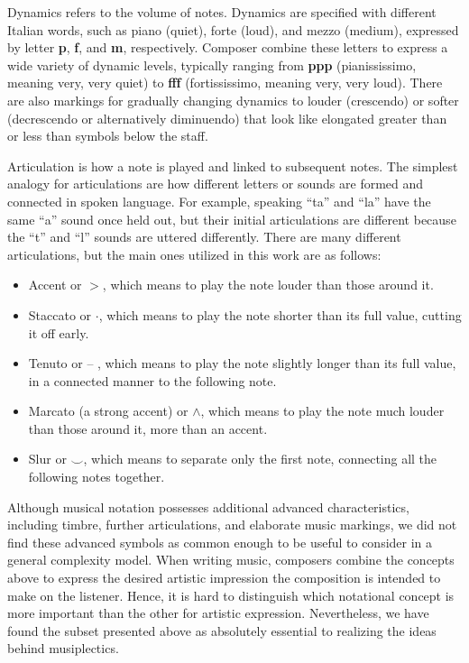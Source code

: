 \documentclass[10pt,preprint]{sigplanconf}
\begin{document}
Dynamics refers to the volume of notes. Dynamics are specified with different Italian words, such as piano (quiet), forte (loud), and mezzo (medium), expressed by letter \textbf{p}, \textbf{f}, and \textbf{m}, respectively. Composer combine these letters to express a wide variety of dynamic levels, typically ranging from \textbf{ppp} (pianississimo, meaning very, very quiet) to \textbf{fff} (fortississimo, meaning very, very loud). There are also markings for gradually changing dynamics to louder (crescendo) or softer (decrescendo or alternatively diminuendo) that look like elongated greater than or less than symbols below the staff.

Articulation is how a note is played and linked to subsequent notes. The simplest analogy for articulations are how different letters or sounds are formed and connected in spoken language. For example, speaking ``ta'' and ``la'' have the same ``a'' sound once held out, but their initial articulations are different because the ``t'' and ``l'' sounds are uttered differently. There are many different articulations, but the main ones utilized in this work are as follows:

\begin{itemize}
\item Accent or $>$, which means to play the note louder than those around it.
\item Staccato or $\cdot$, which means to play the note shorter than its full value, cutting it off early.
\item Tenuto or -- , which means to play the note slightly longer than its full value, in a connected manner to the following note.
\item Marcato (a strong accent) or $\wedge$, which means to play the note much louder than those around it, more than an accent.
\item Slur or $\smile$, which means to separate only the first note, connecting all the following notes together.
\end{itemize}

Although musical notation possesses additional advanced characteristics, including timbre, further articulations, and elaborate music markings, we did not find these advanced symbols as common enough to be useful to consider in a general complexity model. When writing music, composers combine the concepts above to express the desired artistic impression the composition is intended to make on the listener. Hence, it is hard to distinguish which notational concept is more important than the other for artistic expression. Nevertheless, we have found the subset presented above as absolutely essential to realizing the ideas behind musiplectics.
\end{document}
